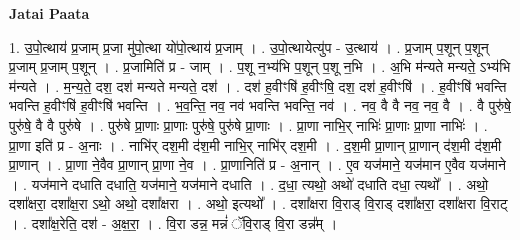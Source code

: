 \documentclass[17pt]{extarticle}
\begin{document}
\textbf{Jatai Paata} \newline

1. उ॒पो॒त्थाय॑ प्र॒जाम् प्र॒जा मु॑पो॒त्था यो॑पो॒त्थाय॑ प्र॒जाम् । . उ॒पो॒त्थायेत्यु॑प - उ॒त्थाय॑ । . प्र॒जाम् प॒शून् प॒शून् प्र॒जाम् प्र॒जाम् प॒शून् । . प्र॒जामिति॑ प्र - जाम् । . प॒शू न॒भ्य॑भि प॒शून् प॒शू न॒भि । . अ॒भि म॑न्यते मन्यते॒ ऽभ्य॑भि म॑न्यते । . म॒न्य॒ते॒ दश॒ दश॑ मन्यते मन्यते॒ दश॑ । . दश॑ ह॒वीꣳषि॑ ह॒वीꣳषि॒ दश॒ दश॑ ह॒वीꣳषि॑ । . ह॒वीꣳषि॑ भवन्ति भवन्ति ह॒वीꣳषि॑ ह॒वीꣳषि॑ भवन्ति । . भ॒व॒न्ति॒ नव॒ नव॑ भवन्ति भवन्ति॒ नव॑ । . नव॒ वै वै नव॒ नव॒ वै । . वै पुरु॑षे॒ पुरु॑षे॒ वै वै पुरु॑षे । . पुरु॑षे प्रा॒णाः प्रा॒णाः पुरु॑षे॒ पुरु॑षे प्रा॒णाः । . प्रा॒णा नाभि॒र् नाभिः॑ प्रा॒णाः प्रा॒णा नाभिः॑ । . प्रा॒णा इति॑ प्र - अ॒नाः । . नाभि॑र् दश॒मी द॑श॒मी नाभि॒र् नाभि॑र् दश॒मी । . द॒श॒मी प्रा॒णान् प्रा॒णान् द॑श॒मी द॑श॒मी प्रा॒णान् । . प्रा॒णा ने॒वैव प्रा॒णान् प्रा॒णा ने॒व । . प्रा॒णानिति॑ प्र - अ॒नान् । . ए॒व यज॑माने॒ यज॑मान ए॒वैव यज॑माने । . यज॑माने दधाति दधाति॒ यज॑माने॒ यज॑माने दधाति । . द॒धा॒ त्यथो॒ अथो॑ दधाति दधा॒ त्यथो᳚ । . अथो॒ दशा᳚क्षरा॒ दशा᳚क्ष॒रा ऽथो॒ अथो॒ दशा᳚क्षरा । . अथो॒ इत्यथो᳚ । . दशा᳚क्षरा वि॒राड् वि॒राड् दशा᳚क्षरा॒ दशा᳚क्षरा वि॒राट् । . दशा᳚क्ष॒रेति॒ दश॑ - अ॒क्ष॒रा॒ । . वि॒रा डन्न॒ मन्नं॑ ॅवि॒राड् वि॒रा डन्न᳚म् । \newline
\end{document}
